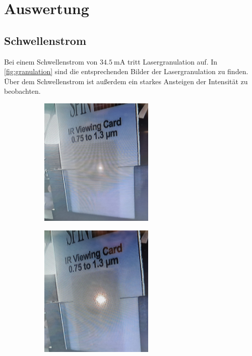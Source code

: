 \section{Auswertung}
\label{sec:Auswertung}

\subsection{Schwellenstrom}
\label{Schwelle}
Bei einem Schwellenstrom von $\SI{34,5}{\milli\ampere}$ tritt Lasergranulation auf. In \autoref{fig:granulation}
sind die entsprechenden Bilder der Lasergranulation zu finden. Über dem Schwellenstrom ist außerdem ein starkes
Ansteigen der Intensität zu beobachten.

\begin{figure}
    \begin{subfigure}[c]{0.5\textwidth}
        \centering
        \includegraphics[width=0.6\textwidth]{content/pics/1.jpg}
    \end{subfigure}
    \hfill
    \begin{subfigure}[c]{0.5\textwidth}
        \centering
        \includegraphics[width=0.6\textwidth]{content/pics/2.jpg}

\end{subfigure}
\end{figure}
